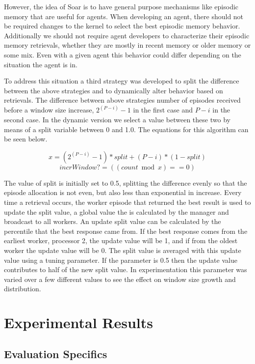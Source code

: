 \documentclass[11pt]{article} %
\begin{document}
However, the idea of Soar is to have general purpose mechanisms like episodic
memory that are useful for agents. When developing an agent, there should not be
required changes to the kernel to select the best episodic memory behavior.
Additionally we should not require agent developers to characterize their
episodic memory retrievals, whether they are mostly in recent memory or older
memory or some mix. Even with a given agent this behavior could differ depending
on the situation the agent is in.

To address this situation a third strategy was developed to split the difference
between the above strategies and to dynamically alter behavior based on
retrievals. The difference between above strategies number of episodes received
before a window size increase, $2^(P-i) -1$ in the first case and $P-i$ in the
second case. In the dynamic version we select a value between these two by means
of a split variable between 0 and 1.0. The equations for this algorithm can be
seen below.

\begin{equation}x = (2^(P-i) -1)*split + (P-i) *(1-split)\end{equation}
\begin{equation}incrWindow? = ((count \bmod x) == 0)\end{equation}

The value of split is initially set to 0.5, splitting the difference evenly so
that the episode allocation is not even, but also less than exponential in
increase. Every time a retrieval occurs, the worker episode that returned the
best result is used to update the split value, a global value the is calculated
by the manager and broadcast to all workers. An update split value can be
calculated by the percentile that the best response came from. If the best
response comes from the earliest worker, processor 2, the update value will be
1, and if from the oldest worker the update value will be 0. The split value is
averaged with this update value using a tuning parameter. If the parameter is
0.5 then the update value contributes to half of the new split value. In
experimentation this parameter was varied over a few different values to see the
effect on window size growth and distribution.

\section{Experimental Results}
\subsection{Evaluation Specifics}
\end{document}
